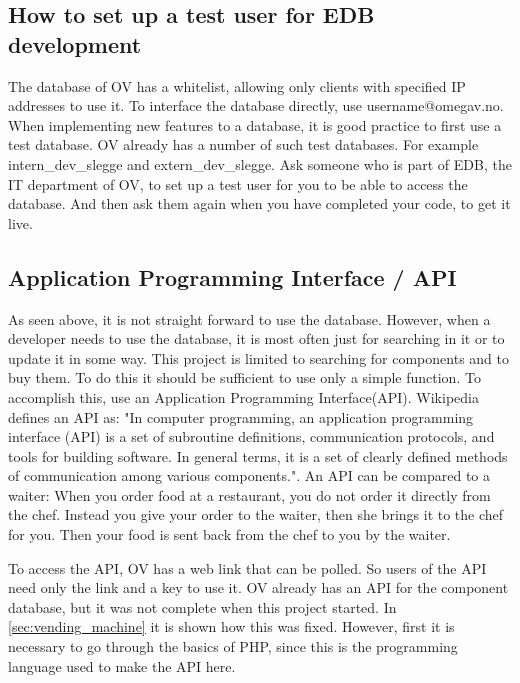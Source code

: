 \subsection{How to set up a test user for EDB development} \label{sec:test_user}
The database of OV has a whitelist, allowing only clients with specified IP addresses to use it. To interface the database directly, use username@omegav.no. When implementing new features to a database, it is good practice to first use a test database. OV already has a number of such test databases. For example intern\_dev\_slegge and extern\_dev\_slegge. 
Ask someone who is part of EDB, the IT department of OV, to set up a test user for you to be able to access the database. And then ask them again when you have completed your code, to get it live.




\subsection{Application Programming Interface / API}
\label{sec:api}
As seen above, it is not straight forward to use the database. However, when a developer needs to use the database, it is most often just for searching in it or to update it in some way. This project is limited to searching for components and to buy them. To do this it should be sufficient to use only a simple function. To accomplish this, use an Application Programming Interface(API). Wikipedia defines an API as: "In computer programming, an application programming interface (API) is a set of subroutine definitions, communication protocols, and tools for building software. In general terms, it is a set of clearly defined methods of communication among various components.". An API can be compared to a waiter: When you order food at a restaurant, you do not order it directly from the chef. Instead you give your order to the waiter, then she brings it to the chef for you. Then your food is sent back from the chef to you by the waiter. 

To access the API, OV has a web link that can be polled. So users of the API need only the link and a key to use it. OV already has an API for the component database, but it was not complete when this project started. In \cref{sec:vending_machine} it is shown how this was fixed. However, first it is necessary to go through the basics of PHP, since this is the programming language used to make the API here.


